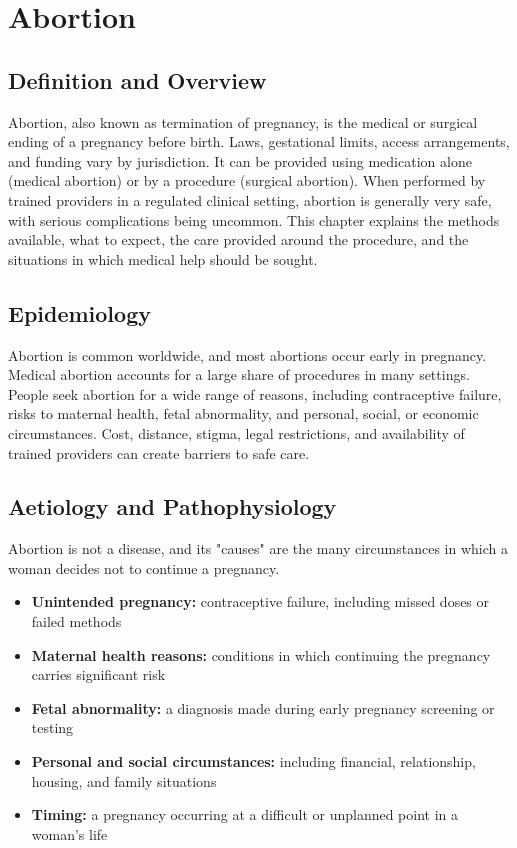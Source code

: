\chapter{Abortion}

\section*{Definition and Overview}
Abortion, also known as termination of pregnancy, is the medical or surgical ending of a pregnancy before birth. Laws, gestational limits, access arrangements, and funding vary by jurisdiction. It can be provided using medication alone (medical abortion) or by a procedure (surgical abortion). When performed by trained providers in a regulated clinical setting, abortion is generally very safe, with serious complications being uncommon. This chapter explains the methods available, what to expect, the care provided around the procedure, and the situations in which medical help should be sought.

\section*{Epidemiology}
Abortion is common worldwide, and most abortions occur early in pregnancy. Medical abortion accounts for a large share of procedures in many settings. People seek abortion for a wide range of reasons, including contraceptive failure, risks to maternal health, fetal abnormality, and personal, social, or economic circumstances. Cost, distance, stigma, legal restrictions, and availability of trained providers can create barriers to safe care.

\section*{Aetiology and Pathophysiology}
Abortion is not a disease, and its "causes" are the many circumstances in which a woman decides not to continue a pregnancy.

\begin{itemize}
    \item \textbf{Unintended pregnancy:} contraceptive failure, including missed doses or failed methods
    \item \textbf{Maternal health reasons:} conditions in which continuing the pregnancy carries significant risk
    \item \textbf{Fetal abnormality:} a diagnosis made during early pregnancy screening or testing
    \item \textbf{Personal and social circumstances:} including financial, relationship, housing, and family situations
    \item \textbf{Timing:} a pregnancy occurring at a difficult or unplanned point in a woman's life
\end{itemize}

